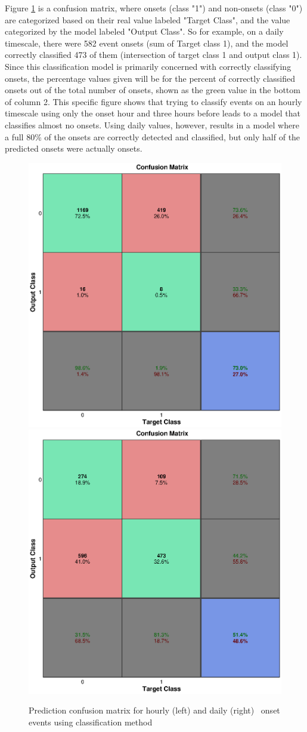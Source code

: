 Figure \ref{fig:OnsetEvents} is a confusion matrix, where onsets (class "1") and non-onsets (class "0") are categorized based on their real value labeled "Target Class", and the value categorized by the model labeled "Output Class". So for example, on a daily timescale, there were 582 event onsets (sum of Target class 1), and the model correctly classified 473 of them (intersection of target class 1 and output class 1). Since this classification model is primarily concerned with correctly classifying onsets, the percentage values given will be for the percent of correctly classified onsets out of the total number of onsets, shown as the green value in the bottom of column 2. This specific figure shows that trying to classify events on an hourly timescale using only the onset hour and three hours before leads to a model that classifies almost no onsets. Using daily values, however, results in a model where a full 80\% of the onsets are correctly detected and classified, but only half of the predicted onsets were actually onsets.

\begin{figure}[htp!]
	\centering
	\includegraphics[width=0.45\linewidth]{Figures/CH5/NNBinaryOnset-hourly.eps}
	\includegraphics[width=0.45\linewidth]{Figures/CH5/NNBinaryOnset-daily.eps}
	\caption{Prediction confusion matrix for hourly (left) and daily (right) \req\ onset events using classification method}
	\label{fig:OnsetEvents}
\end{figure}

